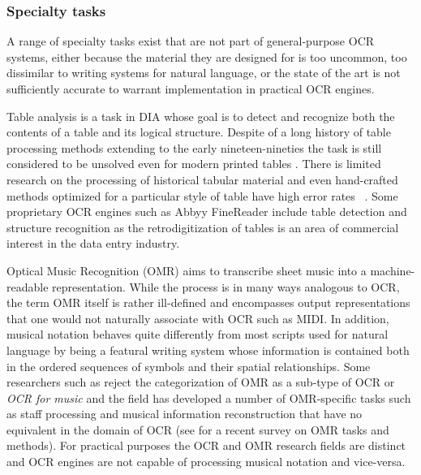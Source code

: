 \subsubsection{Specialty tasks}

A range of specialty tasks exist that are not part of general-purpose OCR
systems, either because the material they are designed for is too uncommon, too
dissimilar to writing systems for natural language, or the state of the art is
not sufficiently accurate to warrant implementation in practical OCR engines.

Table analysis is a task in DIA whose goal is to detect and recognize both the
contents of a table and its logical structure. Despite of a long history of
table processing methods extending to the early nineteen-nineties
\cite{zanibbi2004survey} the task is still considered to be unsolved even for
modern printed tables \cite{gao2019icdar}. There is limited research on the
processing of historical tabular material and even hand-crafted methods
optimized for a particular style of table have high error rates
~\cite{lehenmeier2020layout}. Some proprietary OCR engines such as Abbyy
FineReader include table detection and structure recognition as the
retrodigitization of tables is an area of commercial interest in the data entry
industry.

Optical Music Recognition (OMR) aims to transcribe sheet music into a
machine-readable representation. While the process is in many ways analogous to
OCR, the term OMR itself is rather ill-defined and encompasses output
representations that one would not naturally associate with OCR such as MIDI.
In addition, musical notation behaves quite differently from most scripts used
for natural language by being a featural writing system whose information is
contained both in the ordered sequences of symbols and their spatial
relationships. Some researchers such as \cite{calvo2020understanding} reject
the categorization of OMR as a sub-type of OCR or \emph{OCR for music} and the
field has developed a number of OMR-specific tasks such as staff processing and
musical information reconstruction that have no equivalent in the domain of OCR
(see \cite{shatri2020optical} for a recent survey on OMR tasks and methods).
For practical purposes the OCR and OMR research fields are distinct and OCR
engines are not capable of processing musical notation and vice-versa.

